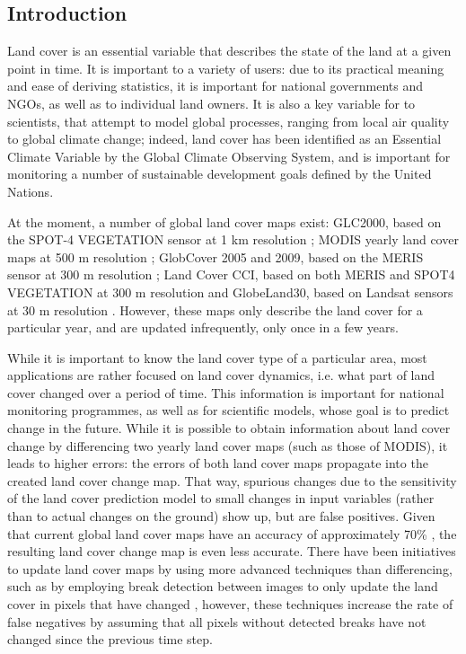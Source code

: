 \documentclass[10pt]{article}
\begin{document}
\begin{mdframed}[style=table,frametitle=\textbf{7. DETAILED DESCRIPTION OF THE RESEARCH PLAN} (max. 2500 words + 1 page literature list)]
\section{Introduction}
Land cover is an essential variable that describes the state of the land at a given point in time. It is important to a variety of users: due to its practical meaning and ease of deriving statistics, it is important for national governments and NGOs, as well as to individual land owners. It is also a key variable for to scientists, that attempt to model global processes, ranging from local air quality to global climate change; indeed, land cover has been identified as an Essential Climate Variable by the Global Climate Observing System, and is important for monitoring a number of sustainable development goals defined by the United Nations.

At the moment, a number of global land cover maps exist: GLC2000, based on the SPOT-4 VEGETATION sensor at 1 km resolution \citep{bartholome_glc2000:_2005}; MODIS yearly land cover maps at 500 m resolution \citep{friedl_modis_2010}; GlobCover 2005 and 2009, based on the MERIS sensor at 300 m resolution \citep{arino_globcover:_2007}; Land Cover CCI, based on both MERIS and SPOT4 VEGETATION at 300 m resolution \citep{bontemps_consistent_2013} and GlobeLand30, based on Landsat sensors at 30 m resolution \citep{chen_global_2015}. However, these maps only describe the land cover for a particular year, and are updated infrequently, only once in a few years.

While it is important to know the land cover type of a particular area, most applications are rather focused on land cover dynamics, i.e. what part of land cover changed over a period of time. This information is important for national monitoring programmes, as well as for scientific models, whose goal is to predict change in the future. While it is possible to obtain information about land cover change by differencing two yearly land cover maps (such as those of MODIS), it leads to higher errors: the errors of both land cover maps propagate into the created land cover change map. That way, spurious changes due to the sensitivity of the land cover prediction model to small changes in input variables (rather than to actual changes on the ground) show up, but are false positives. Given that current global land cover maps have an accuracy of approximately 70\% \citep{bontemps_revisiting_2012}, the resulting land cover change map is even less accurate. There have been initiatives to update land cover maps by using more advanced techniques than differencing, such as by employing break detection between images to only update the land cover in pixels that have changed \citep{jin_land_2017}, however, these techniques increase the rate of false negatives by assuming that all pixels without detected breaks have not changed since the previous time step.


\end{mdframed}
\end{document}

